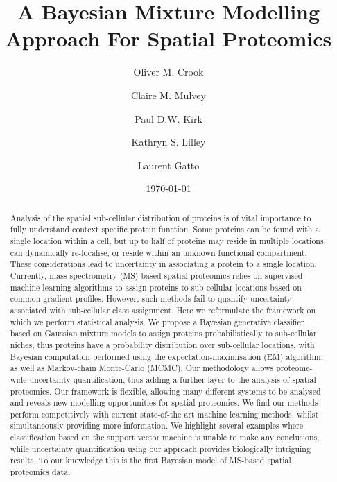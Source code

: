 \documentclass[12pt,english]{article}\usepackage[]{graphicx}\usepackage[]{color}
\begin{document}
\author[1,2,3]{Oliver M. Crook}
\author[2]{Claire M. Mulvey}
\author[3]{Paul D.W. Kirk}
\author[2]{Kathryn S. Lilley}
\author[1,2,4,*]{Laurent Gatto}





\title{A Bayesian Mixture Modelling Approach For Spatial Proteomics}

\date{\small \today}

\maketitle
\begin{abstract}
  Analysis of the spatial sub-cellular distribution of proteins is of
  vital importance to fully understand context specific protein
  function. Some proteins can be found with a single location within a
  cell, but up to half of proteins may reside in multiple locations,
  can dynamically re-localise, or reside within an unknown functional
  compartment. These considerations lead to uncertainty in associating
  a protein to a single location. Currently, mass spectrometry (MS)
  based spatial proteomics relies on supervised machine learning
  algorithms to assign proteins to sub-cellular locations based on
  common gradient profiles. However, such methods fail to quantify
  uncertainty associated with sub-cellular class assignment. Here we
  reformulate the framework on which we perform statistical
  analysis. We propose a Bayesian generative classifier based on
  Gaussian mixture models to assign proteins probabilistically to
  sub-cellular niches, thus proteins have a probability distribution
  over sub-cellular locations, with Bayesian computation
  performed using the expectation-maximisation (EM) algorithm, as well
  as Markov-chain Monte-Carlo (MCMC). Our methodology allows
  proteome-wide uncertainty quantification, thus adding a further
  layer to the analysis of spatial proteomics. Our framework is
  flexible, allowing many different systems to be analysed and reveals
  new modelling opportunities for spatial proteomics. We find our
  methods perform competitively with current state-of-the art
  machine learning methods, whilst simultaneously providing more
  information. We highlight several examples where classification
  based on the support vector machine is unable to make any
  conclusions, while uncertainty quantification using our approach provides
  biologically intriguing results.  To our knowledge this is the first
  Bayesian model of MS-based spatial proteomics data.
\end{abstract}
\end{document}
